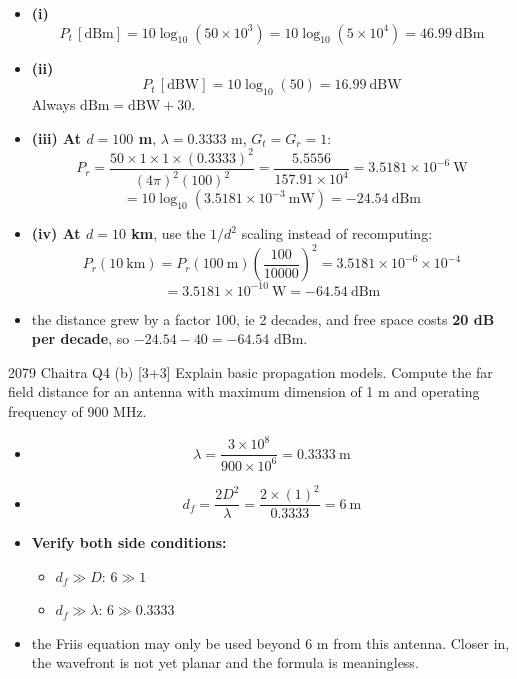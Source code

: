 \begin{itemize}
  \item \textbf{(i)} \[ P_t\,[\text{dBm}] = 10\log_{10}(50 \times 10^{3})
        = 10\log_{10}(5\times10^{4}) = \boxed{46.99\ \text{dBm}} \]
  \item \textbf{(ii)} \[ P_t\,[\text{dBW}] = 10\log_{10}(50) = \boxed{16.99\ \text{dBW}} \]
        {\color{sub}\footnotesize Always $\text{dBm} = \text{dBW} + 30$. \checkmark}
  \item \textbf{(iii) At $d = 100$ m}, $\lambda = 0.3333$ m, $G_t = G_r = 1$:
        \[ P_r = \frac{50 \times 1 \times 1 \times (0.3333)^2}{(4\pi)^2 (100)^2}
               = \frac{5.5556}{157.91 \times 10^{4}} = 3.5181\times10^{-6}\ \text{W} \]
        \[ = 10\log_{10}(3.5181\times10^{-3}\ \text{mW}) = \boxed{-24.54\ \text{dBm}} \]
  \item \textbf{(iv) At $d = 10$ km}, use the $1/d^2$ scaling instead of recomputing:
        \[ P_r(10\ \text{km}) = P_r(100\ \text{m}) \left(\frac{100}{10000}\right)^{2}
           = 3.5181\times10^{-6} \times 10^{-4} \]
        \[ = 3.5181\times10^{-10}\ \text{W} = \boxed{-64.54\ \text{dBm}} \]
  \item {} the distance grew by a factor 100, ie 2 decades, and free space
        costs \textbf{20 dB per decade}, so $-24.54 - 40 = -64.54$ dBm. \checkmark
\end{itemize}

\hr

{\color{sub}\footnotesize {} }

\begin{asked}{2079 Chaitra \textperiodcentered{} Q4 (b) \textperiodcentered{} [3+3]}
Explain basic propagation models. Compute the far field distance for an antenna with maximum
dimension of 1 m and operating frequency of 900 MHz.
\end{asked}

\begin{itemize}
  \item \[ \lambda = \frac{3\times10^{8}}{900\times10^{6}} = 0.3333\ \text{m} \]
  \item \[ d_f = \frac{2D^2}{\lambda} = \frac{2 \times (1)^2}{0.3333}
             = \boxed{6\ \text{m}} \]
  \item \textbf{Verify both side conditions:}
  \begin{itemize}
    \item $d_f \gg D$: \; $6 \gg 1$ \checkmark
    \item $d_f \gg \lambda$: \; $6 \gg 0.3333$ \checkmark
  \end{itemize}
  \item {} the Friis equation may only be used beyond 6 m from this antenna. Closer in,
        the wavefront is not yet planar and the formula is meaningless.
\end{itemize}

